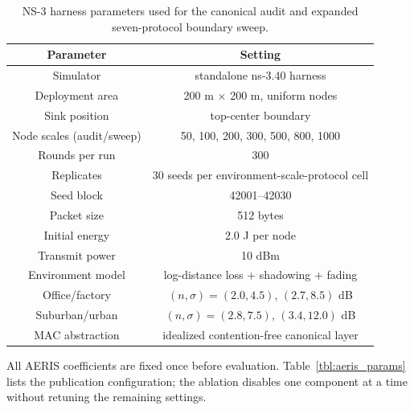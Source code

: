 \documentclass[conference]{IEEEtran}
\begin{document}
\begin{table}[t]
\caption{NS-3 harness parameters used for the canonical audit and expanded seven-protocol boundary sweep.}
\label{tbl:ns3_params}
\centering
\scriptsize
\setlength{\tabcolsep}{2pt}
\begin{tabular*}{\columnwidth}{@{\extracolsep{\fill}}cc@{}}
\toprule
Parameter & Setting \\ 
\midrule
Simulator & standalone ns-3.40 harness \\
Deployment area & 200 m $\times$ 200 m, uniform nodes \\
Sink position & top-center boundary \\
Node scales (audit/sweep) & 50, 100, 200, 300, 500, 800, 1000 \\
Rounds per run & 300 \\
Replicates & 30 seeds per environment-scale-protocol cell \\
Seed block & 42001--42030 \\
Packet size & 512 bytes \\
Initial energy & 2.0 J per node \\
Transmit power & 10 dBm \\
Environment model & log-distance loss + shadowing + fading \\
Office/factory & $(n,\sigma)=(2.0,4.5)$, $(2.7,8.5)$ dB \\
Suburban/urban & $(n,\sigma)=(2.8,7.5)$, $(3.4,12.0)$ dB \\
MAC abstraction & idealized contention-free canonical layer \\
\bottomrule
\end{tabular*}
\end{table}

All AERIS coefficients are fixed once before evaluation. Table~\ref{tbl:aeris_params} lists the publication configuration; the ablation disables one component at a time without retuning the remaining settings.
\end{document}

